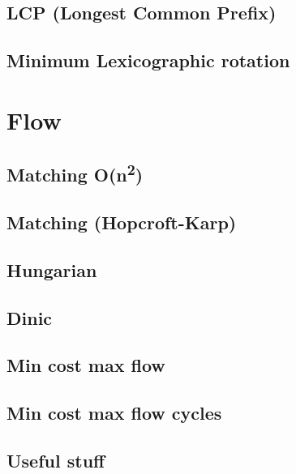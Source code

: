 \subsection{LCP (Longest Common Prefix)}

\subsection{Minimum Lexicographic rotation}

\section{Flow}

\subsection{Matching O(n\textsuperscript{2})}

\subsection{Matching (Hopcroft-Karp)}

\subsection{Hungarian}

\subsection{Dinic}

\subsection{Min cost max flow}

\subsection{Min cost max flow cycles}

\subsection{Useful stuff}



